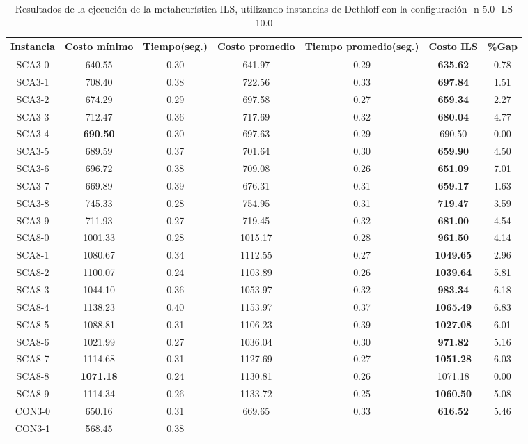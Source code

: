 \begin{table}[ht]
\caption{Resultados de la ejecución de la metaheurística ILS, utilizando instancias de Dethloff con la configuración -n 5.0 -LS 10.0}
\centering
\small
\begin{tabular}{c c c c c c c}
\hline\hline
Instancia & Costo mínimo & Tiempo(seg.) & Costo promedio & Tiempo promedio(seg.) & Costo ILS & \%Gap \\ [0.5ex]
\hline
SCA3-0 & 640.55 & 0.30 & 
641.97 & 0.29 & \bf{635.62} & 
0.78\\SCA3-1 & 708.40 & 0.38 & 
722.56 & 0.33 & \bf{697.84} & 
1.51\\SCA3-2 & 674.29 & 0.29 & 
697.58 & 0.27 & \bf{659.34} & 
2.27\\SCA3-3 & 712.47 & 0.36 & 
717.69 & 0.32 & \bf{680.04} & 
4.77\\SCA3-4 & \bf{690.50} & 0.30 & 
697.63 & 0.29 & 690.50 & 0.00\\
SCA3-5 & 689.59 & 0.37 & 
701.64 & 0.30 & \bf{659.90} & 
4.50\\SCA3-6 & 696.72 & 0.38 & 
709.08 & 0.26 & \bf{651.09} & 
7.01\\SCA3-7 & 669.89 & 0.39 & 
676.31 & 0.31 & \bf{659.17} & 
1.63\\SCA3-8 & 745.33 & 0.28 & 
754.95 & 0.31 & \bf{719.47} & 
3.59\\SCA3-9 & 711.93 & 0.27 & 
719.45 & 0.32 & \bf{681.00} & 
4.54\\SCA8-0 & 1001.33 & 0.28 & 
1015.17 & 0.28 & \bf{961.50} & 
4.14\\SCA8-1 & 1080.67 & 0.34 & 
1112.55 & 0.27 & \bf{1049.65} & 
2.96\\SCA8-2 & 1100.07 & 0.24 & 
1103.89 & 0.26 & \bf{1039.64} & 
5.81\\SCA8-3 & 1044.10 & 0.36 & 
1053.97 & 0.32 & \bf{983.34} & 
6.18\\SCA8-4 & 1138.23 & 0.40 & 
1153.97 & 0.37 & \bf{1065.49} & 
6.83\\SCA8-5 & 1088.81 & 0.31 & 
1106.23 & 0.39 & \bf{1027.08} & 
6.01\\SCA8-6 & 1021.99 & 0.27 & 
1036.04 & 0.30 & \bf{971.82} & 
5.16\\SCA8-7 & 1114.68 & 0.31 & 
1127.69 & 0.27 & \bf{1051.28} & 
6.03\\SCA8-8 & \bf{1071.18} & 0.24 & 
1130.81 & 0.26 & 1071.18 & 0.00\\
SCA8-9 & 1114.34 & 0.26 & 
1133.72 & 0.25 & \bf{1060.50} & 
5.08\\CON3-0 & 650.16 & 0.31 & 
669.65 & 0.33 & \bf{616.52} & 
5.46\\CON3-1 & 568.45 & 0.38 & 

\end{tabular}
\end{table}
